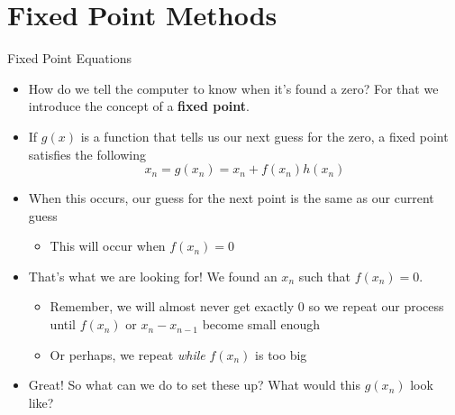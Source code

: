 {}\documentclass[letterpaper,
compress,
xcolor=x11names,
]{beamer}
\begin{document}
\section{Fixed Point Methods}

\begin{frame}{Fixed Point Equations}
	\footnotesize
	\begin{itemize}
		\item How do we tell the computer to know when it's found a zero? For that we introduce the concept of a \textbf{fixed point}. 
		\item<2-> If $g(x)$ is a function that tells us our next guess for the zero, a fixed point satisfies the following
		\begin{equation*}
			x_n = g(x_n) = x_n + f(x_n)h(x_n)
		\end{equation*}
		\item<3-> When this occurs, our guess for the next point is the same as our current guess
		\begin{itemize}
			\item This will occur when $f(x_n) = 0$
		\end{itemize}
		\item<4-> That's what we are looking for! We found an $x_n$ such that $f(x_n)=0$.
		\begin{itemize}
			\item Remember, we will almost never get exactly 0 so we repeat our process until $f(x_n)$ or $x_n - x_{n-1}$ become small enough
			\item Or perhaps, we repeat \textit{while} $f(x_n)$ is too big
		\end{itemize}
		\item<5-> Great! So what can we do to set these up? What would this $g(x_n)$ look like?
	\end{itemize}
\end{frame}

\end{document}
